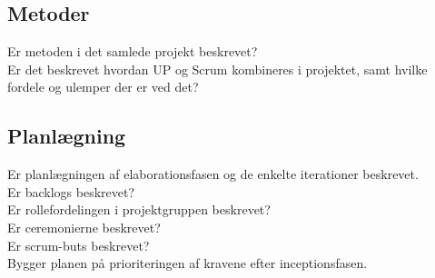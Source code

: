 \subsection{Metoder}
Er metoden i det samlede projekt beskrevet?\\
Er det beskrevet hvordan UP og Scrum kombineres i projektet, samt hvilke fordele og ulemper der er ved det?\\
\subsection{Planlægning}
Er planlægningen af elaborationsfasen og de enkelte iterationer beskrevet.\\
Er backlogs beskrevet?\\
Er rollefordelingen i projektgruppen beskrevet?\\
Er ceremonierne beskrevet?\\
Er scrum-buts beskrevet?\\
Bygger planen på prioriteringen af kravene efter inceptionsfasen.\\
